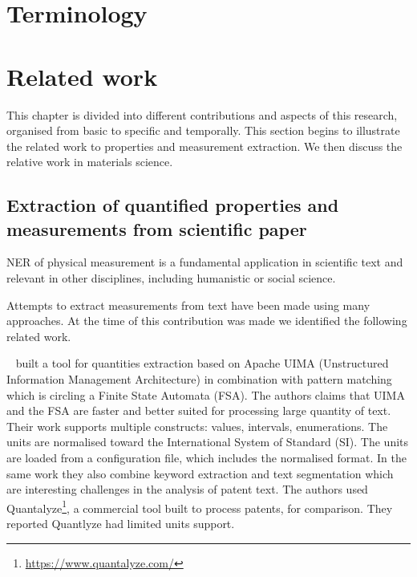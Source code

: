 \documentclass[12pt, a4paper]{report}
\begin{document}


\chapter{Terminology}
\chapter{Related work}
This chapter is divided into different contributions and aspects of this research, organised from basic to specific and temporally. 
This section begins to illustrate the related work to properties and measurement extraction. We then discuss the relative work in materials science. 

\section{Extraction of quantified properties and measurements from scientific paper} 
NER of physical measurement is a fundamental application in scientific text and relevant in other disciplines, including humanistic or social science. 

Attempts to extract measurements from text have been made using many approaches. At the time of this contribution was made we identified the following related work. 

~\cite{aras2014applications} built a tool for quantities extraction based on Apache UIMA (Unstructured Information Management Architecture) in combination with pattern matching which is circling a Finite State Automata (FSA). 
The authors claims that UIMA and the FSA are faster and better suited for processing large quantity of text.
Their work supports multiple constructs: values, intervals, enumerations. The units are normalised toward the International System of Standard (SI). 
The units are loaded from a configuration file, which includes the normalised format. In the same work they also combine keyword extraction and text segmentation which are interesting challenges in the analysis of patent text. 
The authors used Quantalyze\footnote{\url{https://www.quantalyze.com/}}, a commercial tool built to process patents, for comparison. They reported Quantlyze had limited units support. 
\end{document}
